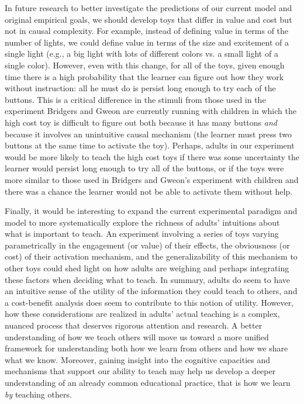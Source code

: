 \documentclass[10pt,letterpaper]{article}
\begin{document}
In future research to better investigate the predictions of our current model and original empirical goals, we should develop toys that differ in value and cost but not in causal complexity. For example, instead of defining value in terms of the number of lights, we could define value in terms of the size and excitement of a single light (e.g., a big light with lots of different colors vs. a small light of a single color). However, even with this change, for all of the toys, given enough time there is a high probability that the learner can figure out how they work without instruction: all he must do is persist long enough to try each of the buttons. This is a critical difference in the stimuli from those used in the experiment Bridgers and Gweon are currently running with children in which the high cost toy is difficult to figure out both because it has many buttons \emph{and} because it involves an unintuitive causal mechanism (the learner must press two buttons at the same time to activate the toy). Perhaps, adults in our experiment would be more likely to teach the high cost toys if there was some uncertainty the learner would persist long enough to try all of the buttons, or if the toys were more similar to those used in Bridgers and Gweon's experiment with children and there was a chance the learner would not be able to activate them without help.

Finally, it would be interesting to expand the current experimental paradigm and model to more systematically explore the richness of adults' intuitions about what is important to teach. An experiment involving a series of toys varying parametrically in the engagement (or value) of their effects, the obviousness (or cost) of their activation mechanism, and the generalizability of this mechanism to other toys could shed light on how adults are weighing and perhaps integrating these factors when deciding what to teach. In summary, adults do seem to have an intuitive sense of the utility of the information they could teach to others, and a cost-benefit analysis does seem to contribute to this notion of utility. However, how these considerations are realized in adults' actual teaching is a complex, nuanced process that deserves rigorous attention and research. A better understanding of how we teach others will move us toward a more unified framework for understanding both how we learn from others and how we share what we know. Moreover, gaining insight into the cognitive capacities and mechanisms that support our ability to teach may help us develop a deeper understanding of an already common educational practice, that is how we learn \emph{by} teaching others.



\setlength{\bibleftmargin}{.125in}
\setlength{\bibindent}{-\bibleftmargin}


\end{document}
